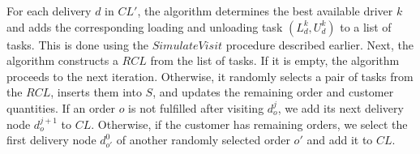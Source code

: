 \documentclass{article}
\begin{document}
For each delivery $d$ in $CL'$, the algorithm determines the best available driver $k$ and adds the corresponding loading and unloading task $(L^k_d, U^k_d)$ to a list of tasks. This is done using the $SimulateVisit$ procedure described earlier. Next, the algorithm constructs a $RCL$ from the list of tasks. If it is empty, the algorithm proceeds to the next iteration. Otherwise, it randomly selects a pair of tasks from the $RCL$, inserts them into $S$, and updates the remaining order and customer quantities. If an order $o$ is not fulfilled after visiting $d^j_{o}$, we add its next delivery node $d^{j+1}_{o}$ to $CL$.  Otherwise, if the customer has remaining orders, we select the first delivery node $d^{0}_{o'}$ of another randomly selected order $o'$ and add it to $CL$.

\end{document}
